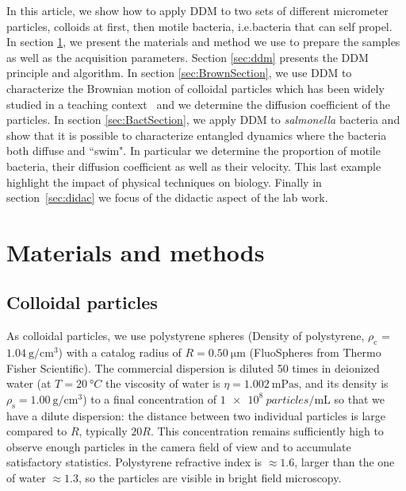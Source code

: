 \documentclass[prb,reprint,amsmath,amssymb]{revtex4-1}
\newcommand{\tg}[1]{{\color{magenta}#1}} %
\begin{document}
In this article, we show how to apply DDM to two sets of different micrometer particles, colloids at first, then motile bacteria, \tg{i.e.bacteria that can self propel}. In section \ref{sec:materials}, we present the materials and method we use to prepare the samples as well as the acquisition parameters. \tg{Section \ref{sec:ddm} presents the DDM principle and algorithm}. In section \ref{sec:BrownSection}, we \tg{use DDM to characterize the Brownian motion of colloidal particles which has been widely studied in a teaching context~\cite{ajp1997lemons, ajp2006newburgh, ajp2006bergstein} and we determine the diffusion coefficient of the particles}. In section \ref{sec:BactSection}, we apply DDM to \textit{salmonella} bacteria and show that it is possible to characterize entangled dynamics where the bacteria both diffuse and ``swim". \tg{In particular we determine the proportion of motile bacteria, their diffusion coefficient as well as their velocity}. This last example highlight the impact of physical techniques on biology. Finally in section~\ref{sec:didac} we focus of the didactic aspect of the lab work.

\section{Materials and methods}
\label{sec:materials}
\subsection{Colloidal particles}

As colloidal particles, we use polystyrene spheres (Density of polystyrene, $\rho_\text{c}$ = $\SI{1.04}{\gram\per\centi\meter\cubed}$) with a catalog radius of $R=\SI{0.50}{\micro\meter}$  (FluoSpheres\circledR{} from Thermo Fisher Scientific). The commercial dispersion is diluted 50 times in \tg{deionized} water \tg{(at $T=\SI{20}{\degree C}$ the viscosity of water is $\eta =\SI{1.002}{\milli\pascal\second}$, and its density is $\rho_\text{s}=\SI{1.00}{\gram\per\centi\meter\cubed}$)} to a final concentration of $\SI{1e8}{particles\per\milli\liter}$ so that we have a dilute dispersion: \tg{the distance between two individual particles} is large compared to $R$, typically $20 R$. This concentration remains sufficiently high to observe enough particles in the camera field of view and to \tg{accumulate satisfactory statistics}. Polystyrene refractive index is $\approx 1.6$, larger than the one of water $\approx 1.3$, so the particles are visible in bright field microscopy.
\end{document}
